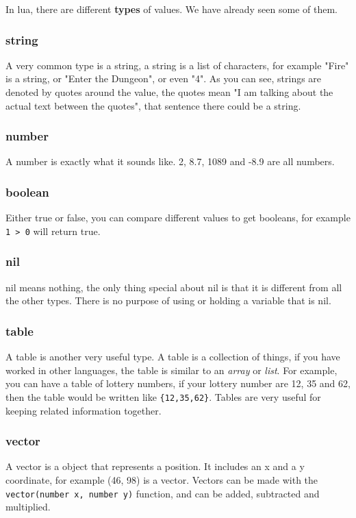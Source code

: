 \documentclass{book}
\begin{document}
In lua, there are different \textbf{types} of values. We have already seen some of them.

\subsubsection{string}
A very common type is a string, a string is a list of characters, for example "Fire" is a string, or "Enter the Dungeon", or even "4". As you can see, strings are denoted by quotes around the value, the quotes mean "I am talking about the actual text between the quotes", that sentence there could be a string.

\subsubsection{number}
A number is exactly what it sounds like. 2, 8.7, 1089 and -8.9 are all numbers.

\subsubsection{boolean}
Either true or false, you can compare different values to get booleans, for example \texttt{1 > 0} will return true.

\subsubsection{nil}
nil means nothing, the only thing special about nil is that it is different from all the other types. There is no purpose of using or holding a variable that is nil.

\subsubsection{table}
A table is another very useful type. A table is a collection of things, if you have worked in other languages, the table is similar to an \textit{array} or \textit{list}. For example, you can have a table of lottery numbers, if your lottery number are 12, 35 and 62, then the table would be written like \texttt{\{12,35,62\}}. Tables are very useful for keeping related information together.

\subsubsection{vector}
A vector is a object that represents a position. It includes an x and a y coordinate, for example (46, 98) is a vector. Vectors can be made with the \texttt{vector(number x, number y)} function, and can be added, subtracted and multiplied.
\end{document}
